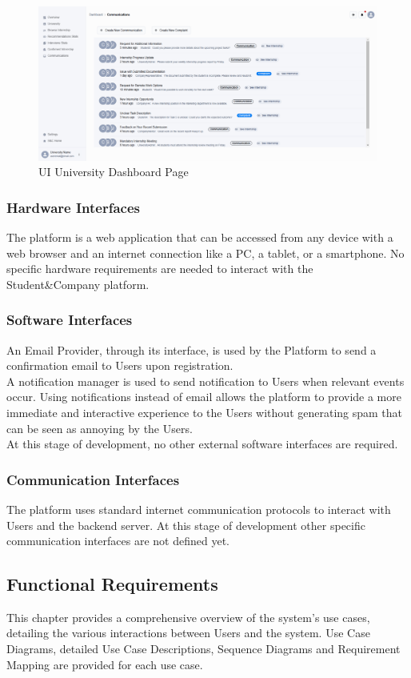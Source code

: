 \begin{figure}[H]
    \centering
    \includegraphics[width=\textwidth]{Latex/Images/UI/v2/Uni-Dashboard.png}
    \caption{UI University Dashboard Page}
    \label{fig:universityDashboard}
\end{figure}

\subsubsection{Hardware Interfaces}
The platform is a web application that can be accessed from any device with a web browser and an internet connection like a PC, a tablet, or a smartphone. No specific hardware requirements are needed to interact with the Student\&Company platform.
\subsubsection{Software Interfaces}
\label{subsec:SWInteface}
An Email Provider, through its interface, is used by the Platform to send a confirmation email to Users upon registration. \\
A notification manager is used to send notification to Users when relevant events occur. Using notifications instead of email allows the platform to provide a more immediate and interactive experience to the Users without generating spam that can be seen as annoying by the Users.\\
At this stage of development, no other external software interfaces are required.
\subsubsection{Communication Interfaces}
The platform uses standard internet communication protocols to interact with Users and the backend server. At this stage of development other specific communication interfaces are not defined yet.

\subsection{Functional Requirements}
This chapter provides a comprehensive overview of the system's use cases, detailing the various interactions between Users and the system.
Use Case Diagrams, detailed Use Case Descriptions, Sequence Diagrams and Requirement Mapping are provided for each use case.
